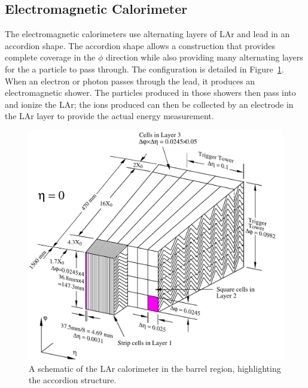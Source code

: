 \subsection{Electromagnetic Calorimeter}

The electromagnetic calorimeters use alternating layers of \acl{LAr} and lead in an accordion shape. 
The accordion shape allows a construction that provides complete coverage in the $\phi$ direction while also providing many alternating layers for the a particle to pass through.
The configuration is detailed in Figure~\ref{fig:calo_barrel_schematic}.
When an electron or photon passes through the lead, it produces an electromagnetic shower.
The particles produced in those showers then pass into and ionize the \acl{LAr}; the ions produced can then be collected by an electrode in the \acl{LAr} layer to provide the actual energy measurement.

\begin{figure}[hbtp]
\includegraphics[width=\fullfig]{figures/calo_barrel_schematic.pdf}
\caption{A schematic of the \ac{LAr} calorimeter in the barrel region, highlighting the accordion structure.}
\label{fig:calo_barrel_schematic}
\end{figure}

